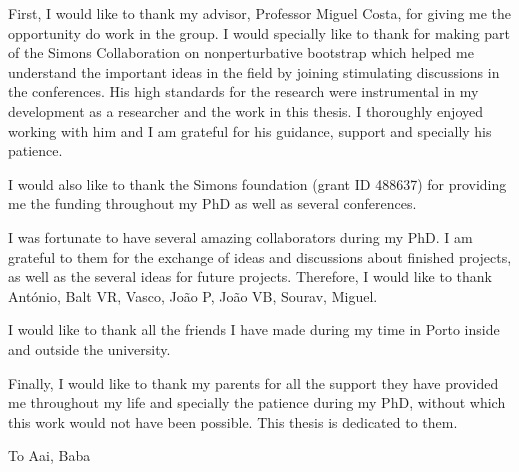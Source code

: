 \documentclass[11pt, twoside,hidelinks]{Thesis}
\begin{document}
\begin{acknowledgements}

  First, I would like to thank my advisor, Professor Miguel Costa, for giving me the opportunity do work in the group.
  I would specially like to thank for making part of the Simons Collaboration on nonperturbative bootstrap which helped me understand the important ideas in the field by joining stimulating discussions in the conferences.
  His high standards for the research were instrumental in my development as a researcher and the work in this thesis.
  I thoroughly enjoyed working with him and I am grateful for his guidance, support and specially his patience.
  
  I would also like to thank the Simons foundation (grant ID 488637) for providing me the funding throughout my PhD as well as several conferences.
  
  I was fortunate to have several amazing collaborators during my PhD.
  I am grateful to them for the exchange of ideas and discussions about finished projects, as well as the several ideas for future projects.
  Therefore, I would like to thank António, Balt VR, Vasco, João P, João VB, Sourav, Miguel.
  
  I would like to thank all the friends I have made during my time in Porto inside and outside the university.
  
  Finally, I would like to thank my parents for all the support they have provided me throughout my life and specially the patience during my PhD, without which this work would not have been possible.
  This thesis is dedicated to them.
\end{acknowledgements}



\begin{dedicatory}
  To 
  Aai, Baba
\end{dedicatory}

\addvspacetoc{3mm} %

\end{document}

